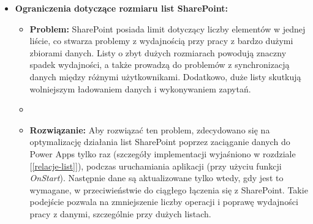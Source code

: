 \begin{itemize}
    \item \textbf{Ograniczenia dotyczące rozmiaru list SharePoint:}
          \begin{itemize}
              \item \textbf{Problem:} SharePoint posiada limit dotyczący liczby elementów w jednej liście, co stwarza problemy z wydajnością przy pracy z bardzo dużymi zbiorami danych. Listy o zbyt dużych rozmiarach powodują znaczny spadek wydajności, a także prowadzą do problemów z synchronizacją danych między różnymi użytkownikami. Dodatkowo, duże listy skutkują wolniejszym ładowaniem danych i wykonywaniem zapytań.
              \item {}
              \item \textbf{Rozwiązanie:} Aby rozwiązać ten problem, zdecydowano się na optymalizację działania list SharePoint poprzez zaciąganie danych do Power Apps tylko raz (szczegóły implementacji wyjaśniono w rozdziale [\ref{relacje-list}]), podczas uruchamiania aplikacji (przy użyciu funkcji \emph{OnStart}). Następnie dane są aktualizowane tylko wtedy, gdy jest to wymagane, w przeciwieństwie do ciągłego łączenia się z SharePoint. Takie podejście pozwala na zmniejszenie liczby operacji i poprawę wydajności pracy z danymi, szczególnie przy dużych listach.
          \end{itemize}
\end{itemize}
